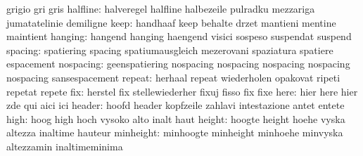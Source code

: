                            grigio                    gri
                           gris
                 halfline: halveregel                halfline
                           halbezeile                pulradku
                           mezzariga                 jumatatelinie
                           demiligne
                     keep: handhaaf                  keep
                           behalte                   drzet
                           mantieni                  mentine
                           maintient
                  hanging: hangend                   hanging
                           haengend                  visici
                           sospeso                   suspendat
                           suspend
                  spacing: spatiering                spacing
                           spatiumausgleich          mezerovani
                           spaziatura                spatiere
                           espacement
                nospacing: geenspatiering            nospacing
                           nospacing                 nospacing
                           nospacing                 nospacing
                           sansespacement
                   repeat: herhaal                   repeat
                           wiederholen               opakovat
                           ripeti                    repetat
                           repete
                      fix: herstel                   fix
                           stellewiederher           fixuj
                           fisso                     fix
                           fixe
                     here: hier                      here
                           hier                      zde
                           qui                       aici
                           ici
                   header: hoofd                     header
                           kopfzeile                 zahlavi
                           intestazione              antet
                           entete
                     high: hoog                      high
                           hoch                      vysoko
                           alto                      inalt
                           haut
                   height: hoogte                    height
                           hoehe                     vyska
                           altezza                   inaltime
                           hauteur
                minheight: minhoogte                 minheight
                           minhoehe                  minvyska
                           altezzamin                inaltimeminima
